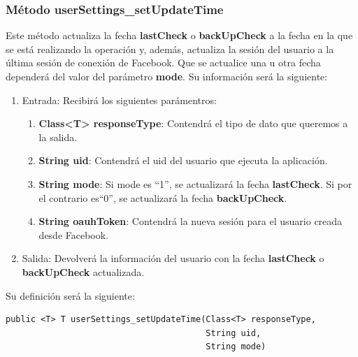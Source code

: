 \subsubsection{Método userSettings\_setUpdateTime}
Este método actualiza la fecha \textbf{lastCheck} o \textbf{backUpCheck} a la fecha en la que se está realizando la operación y, además, actualiza la sesión del usuario a la última sesión de conexión de Facebook. Que se actualice una u otra fecha dependerá del valor del parámetro \textbf{mode}. Su información será la siguiente:
\begin{enumerate}
\item Entrada: Recibirá los siguientes parámentros:
\begin{enumerate}
\item \textbf{Class<T> responseType}: Contendrá el tipo de dato que queremos a la salida. 
\item \textbf{String uid}: Contendrá el uid del usuario que ejecuta la aplicación.
\item \textbf{String mode}: Si mode es ``1'', se actualizará la fecha \textbf{lastCheck}. Si por el contrario es``0'', se actualizará la fecha \textbf{backUpCheck}.
\item \textbf{String oauhToken}: Contendrá la nueva sesión para el usuario creada desde Facebook.
\end{enumerate}
\item Salida: Devolverá la información del usuario con la fecha \textbf{lastCheck} o \textbf{backUpCheck} actualizada.
\end{enumerate}
\bigskip
\par
Su definición será la siguiente:
\begin{verbatim}public <T> T userSettings_setUpdateTime(Class<T> responseType, 
                                        String uid, 
                                        String mode) \end{verbatim}

